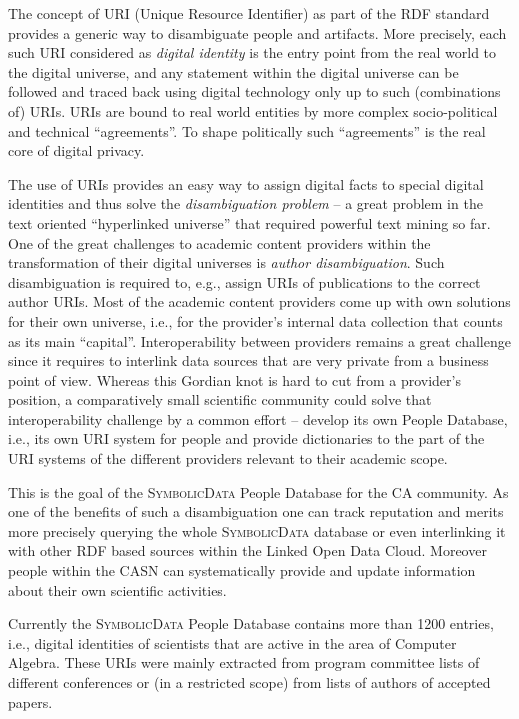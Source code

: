 \documentclass[a4paper,11pt]{article}
\def\SD{\textsc{Symbolic\-Data}}
\begin{document}
\begin{multicols}{2}
\Ueberschriftu{The {\SD} People Database}

The concept of URI (Unique Resource Identifier) as part of the RDF standard
provides a generic way to disambiguate people and artifacts.  More precisely,
each such URI considered as \emph{digital identity} is the entry point from
the real world to the digital universe, and any statement within the digital
universe can be followed and traced back using digital technology only up to
such (combinations of) URIs. URIs are bound to real world entities by more
complex socio-political and technical ``agreements''. To shape politically
such ``agreements'' is the real core of digital privacy.

The use of URIs provides an easy way to assign digital facts to special
digital identities and thus solve the \emph{disambiguation problem} -- a great
problem in the text oriented ``hyperlinked universe'' that required powerful
text mining so far.  One of the great challenges to academic content providers
within the transformation of their digital universes is \emph{author
  disambiguation}. Such disambiguation is required to, e.g., assign URIs of
publications to the correct author URIs.  Most of the academic content
providers come up with own solutions for their own universe, i.e., for the
provider's internal data collection that counts as its main ``capital''.
Interoperability between providers remains a great challenge since it requires
to interlink data sources that are very private from a business point of view.
Whereas this Gordian knot is hard to cut from a provider's position, a
comparatively small scientific community could solve that interoperability
challenge by a common effort -- develop its own People Database, i.e., its own
URI system for people and provide dictionaries to the part of the URI systems
of the different providers relevant to their academic scope.

This is the goal of the {\SD} People Database for the CA community.  As one of
the benefits of such a disambiguation one can track reputation and merits more
precisely querying the whole {\SD} database or even interlinking it with other
RDF based sources within the Linked Open Data Cloud. Moreover people within
the CASN can systematically provide and update information about their own
scientific activities.

Currently the {\SD} People Database contains more than 1200 entries, i.e.,
digital identities of scientists that are active in the area of Computer
Algebra.  These URIs were mainly extracted from program committee lists of
different conferences or (in a restricted scope) from lists of authors of
accepted papers.


\end{multicols}
\end{document}
